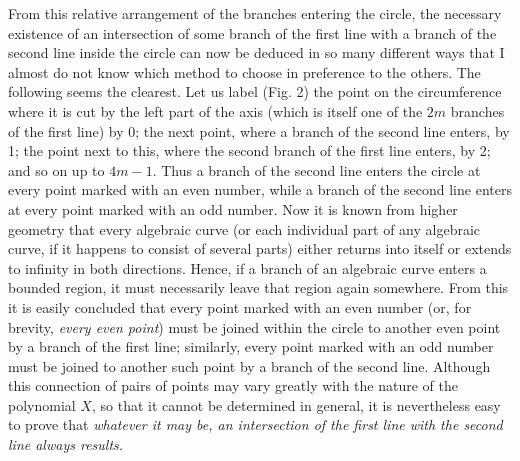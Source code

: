  From this relative arrangement of the branches entering the circle, the necessary existence of an intersection of some branch of the first line with a branch of the second line inside the circle can now be deduced in so many different ways that I almost do not know which method to choose in preference to the others. The following seems the clearest. Let us label (Fig. 2) the point on the circumference where it is cut by the left part of the axis (which is itself one of the $2m$ branches of the first line) by 0; the next point, where a branch of the second line enters, by 1; the point next to this, where the second branch of the first line enters, by 2; and so on up to $4m-1$. Thus a branch of the second line enters the circle at every point marked with an even number, while a branch of the second line enters at every point marked with an odd number. Now it is known from higher geometry that every algebraic curve (or each individual part of any algebraic curve, if it happens to consist of several parts) either returns into itself or extends to infinity in both directions. Hence, if a branch of an algebraic curve enters a bounded region, it must necessarily leave that region again somewhere. From this it is easily concluded that every point marked with an even number
 (or, for brevity, \textit{every even point}) must be joined within the circle to another even point by a branch of the first line; similarly, every point marked with an odd number must be joined to another such point by a branch of the second line. Although this connection of pairs of points may vary greatly with the nature of the polynomial $X$, so that it cannot be determined in general, it is nevertheless easy to prove that \textit{whatever it may be, an intersection of the first line with the second line always results.}

